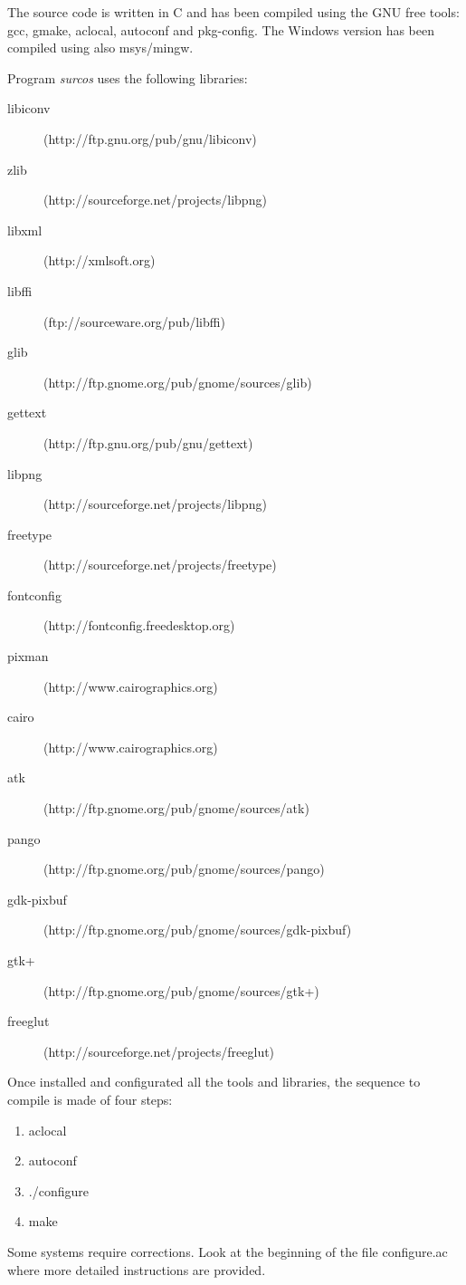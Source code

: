 The source code is written in C and has been compiled using the GNU free tools: gcc, gmake, 
aclocal, autoconf and pkg-config. The Windows version has been compiled using also msys/mingw.

Program \emph{surcos} uses the following libraries:
\begin{description}
\item[libiconv] (http://ftp.gnu.org/pub/gnu/libiconv)
\item[zlib] (http://sourceforge.net/projects/libpng)
\item[libxml] (http://xmlsoft.org)
\item[libffi] (ftp://sourceware.org/pub/libffi)
\item[glib] (http://ftp.gnome.org/pub/gnome/sources/glib)
\item[gettext] (http://ftp.gnu.org/pub/gnu/gettext)
\item[libpng] (http://sourceforge.net/projects/libpng)
\item[freetype] (http://sourceforge.net/projects/freetype)
\item[fontconfig] (http://fontconfig.freedesktop.org)
\item[pixman] (http://www.cairographics.org)
\item[cairo] (http://www.cairographics.org)
\item[atk] (http://ftp.gnome.org/pub/gnome/sources/atk)
\item[pango] (http://ftp.gnome.org/pub/gnome/sources/pango)
\item[gdk-pixbuf] (http://ftp.gnome.org/pub/gnome/sources/gdk-pixbuf)
\item[gtk+] (http://ftp.gnome.org/pub/gnome/sources/gtk+)
\item[freeglut] (http://sourceforge.net/projects/freeglut)
\end{description}

Once installed and configurated all the tools and libraries, the sequence to compile is made of four steps:

\begin{enumerate}
\item aclocal
\item autoconf
\item ./configure
\item make
\end{enumerate}
Some systems require corrections. Look at the beginning of the file configure.ac
where more detailed instructions are provided.  

